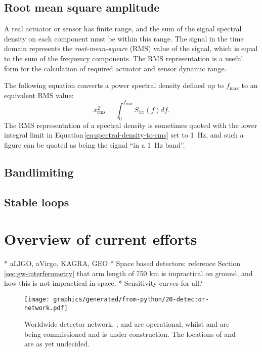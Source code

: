 \subsection{\label{sec:rms-amplitude}Root mean square amplitude}
A real actuator or sensor has finite range, and the sum of the signal spectral density on each component must be within this range. The signal in the time domain represents the \emph{root-mean-square} (\gls{RMS}) value of the signal, which is equal to the sum of the frequency components. The \gls{RMS} representation is a useful form for the calculation of required actuator and sensor dynamic range.

The following equation converts a power spectral density defined up to $f_{\text{max}}$ to an equivalent \gls{RMS} value:
\begin{equation}
  \label{eq:spectral-density-to-rms}
  x_{\text{rms}}^2 = \int^{f_{\text{max}}}_{0} S_{xx} \left( f \right) df.
\end{equation}
The \gls{RMS} representation of a spectral density is sometimes quoted with the lower integral limit in Equation\,\ref{eq:spectral-density-to-rms} set to \SI{1}{\hertz}, and such a figure can be quoted as being the signal ``in a \SI{1}{\hertz} band''.

\subsection{Bandlimiting}

\subsection{\label{sec:gain-phase-margin}Stable loops}

\section{Overview of current efforts}
* aLIGO, aVirgo, KAGRA, GEO
* Space based detectors: reference Section\,\ref{sec:gw-interferometry} that arm length of 750 km is impractical on ground, and how this is not impractical in space.
* Sensitivity curves for all?

\begin{figure}
  \centering
  \texttt{[image: graphics/generated/from-python/20-detector-network.pdf]}
  \caption[Worldwide detector network]{Worldwide detector network. \GEO{}, \LHO{} and \LLO{} are operational, whilst \VIRGO{} and \KAGRA{} are being commissioned and \INDIGO{} is under construction. The locations of \THEET{} and \LIGOCE{} are as yet undecided.}
\end{figure}

